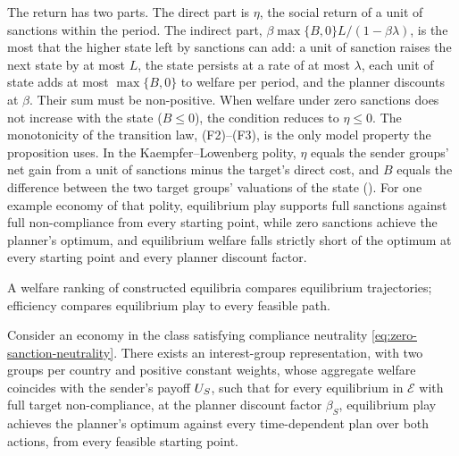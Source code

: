  The return has two parts. The direct part is $\eta$, the social return of a unit of
sanctions within the period. The indirect part, $\beta\max\{B,0\}L/(1-\beta\lambda)$, is the
most that the higher state left by sanctions can add: a unit of sanction raises the next
state by at most $L$, the state persists at a rate of at most $\lambda$, each unit of state
adds at most $\max\{B,0\}$ to welfare per period, and the planner discounts at $\beta$.
Their sum must be non-positive. When welfare under zero sanctions does not increase with the state
($B\le0$), the condition reduces to $\eta\le0$. The monotonicity of the transition law,
\textup{(F2)--(F3)}, is the only model property the proposition uses. In the
Kaempfer--Lowenberg polity, $\eta$ equals the sender groups' net gain from a unit of
sanctions minus the target's direct cost, and $B$ equals the difference between the
two target groups' valuations of the state ().
For one example economy of that polity, equilibrium play supports full sanctions against
full non-compliance from every starting point, while zero sanctions achieve the planner's
optimum, and equilibrium welfare falls strictly short of the optimum at every starting
point and every planner discount factor.

 A welfare ranking of
constructed equilibria compares equilibrium trajectories; efficiency compares equilibrium play to every feasible path.

\begin{proposition}
\label{prop:planner-efficient-persistence}
Consider an economy in the class satisfying compliance neutrality
\eqref{eq:zero-sanction-neutrality}. There exists an interest-group
representation, with two groups per country and positive constant weights, whose
aggregate welfare coincides with the sender's payoff $U_S$, such that for every
equilibrium in $\mathcal E$ with full target non-compliance, at the planner discount
factor $\beta_S$, equilibrium play achieves the planner's optimum against every
time-dependent plan over both actions, from every feasible starting point.
\end{proposition}

